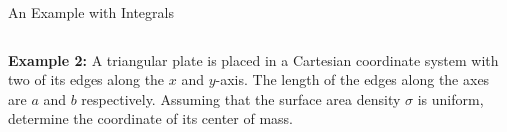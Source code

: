 \documentclass[12pt,compress,aspectratio=169]{beamer}
\begin{document}
\begin{frame}{An Example with Integrals}
  \begin{columns}
    \textbf{Example 2:} A triangular plate is placed in a Cartesian coordinate
    system with two of its edges along the $x$ and $y$-axis. The length of the
    edges along the axes are $a$ and $b$ respectively. Assuming that the
    surface area density $\sigma$ is uniform, determine the coordinate of its
    center of mass.

  \end{columns}
\end{frame}



%
%      
\end{document}
